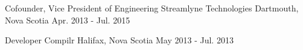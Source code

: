 \begin{cventries}
  \cventry
    {Cofounder, Vice President of Engineering} %
    {Streamlyne Technologies}  %
    {Dartmouth, Nova Scotia} %
    {Apr. 2013 - Jul. 2015} %
    {
    }

  \cventry
    {Developer} %
    {Compilr} %
    {Halifax, Nova Scotia} %
    {May 2013 - Jul. 2013} %
    {
    }

\end{cventries}
